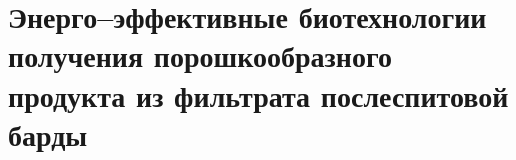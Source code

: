 \chapter{Энерго--эффективные биотехнологии получения порошкообразного продукта из фильтрата послеспитовой барды}






